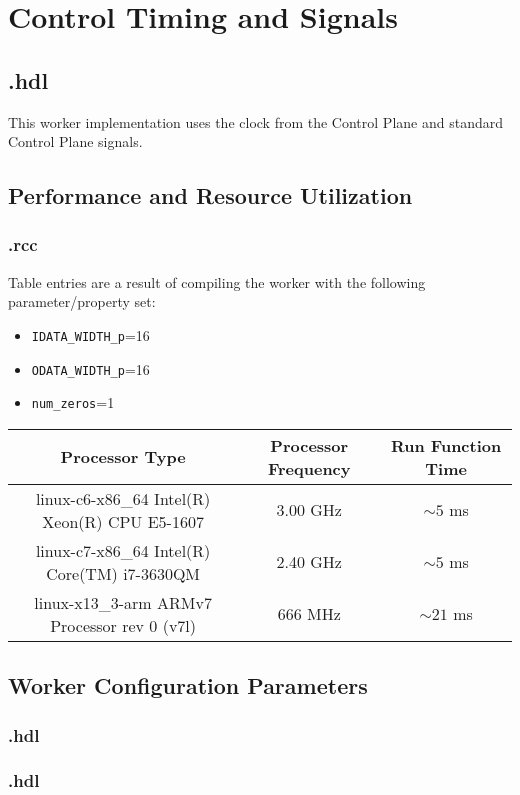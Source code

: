 \section*{Control Timing and Signals}
\subsection*{\comp.hdl}
\begin{flushleft}
	This worker implementation uses the clock from the Control Plane and standard Control Plane signals.
\end{flushleft}

\begin{landscape}
\section*{Performance and Resource Utilization}
\subsubsection*{\comp.rcc}
Table entries are a result of compiling the worker with the following parameter/property set:\
\begin{itemize}
	\item \verb+IDATA_WIDTH_p+=16
	\item \verb+ODATA_WIDTH_p+=16
	\item \verb+num_zeros+=1
\end{itemize}
\begin{scriptsize}
	\begin{tabular}{|c|c|c|}
		\hline
		\rowcolor{blue}
		Processor Type                                & Processor Frequency & Run Function Time \\
		\hline
		linux-c6-x86\_64 Intel(R) Xeon(R) CPU E5-1607 & 3.00 GHz            & $\sim5$ ms        \\
		\hline
		linux-c7-x86\_64 Intel(R) Core(TM) i7-3630QM  & 2.40 GHz            & $\sim5$ ms        \\
		\hline
		linux-x13\_3-arm ARMv7 Processor rev 0 (v7l)    & 666 MHz             & $\sim21$ ms       \\
		\hline
	\end{tabular}
\section*{Worker Configuration Parameters}
\subsubsection*{\comp.hdl}
%
\end{scriptsize}
\subsubsection*{\comp.hdl}
%
\end{landscape}
